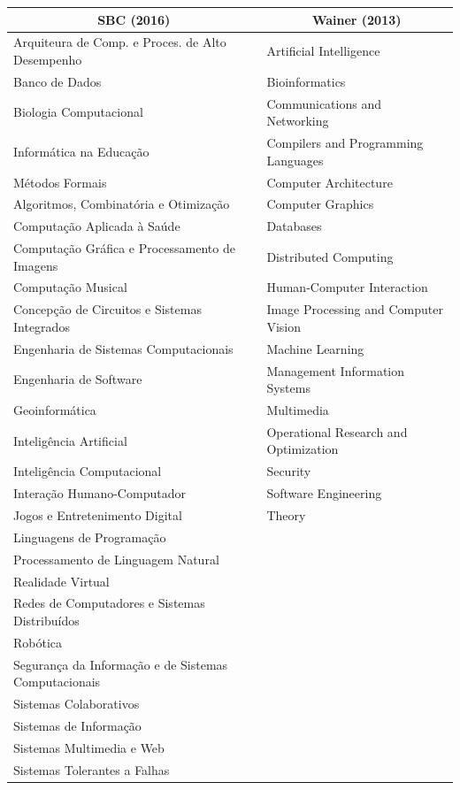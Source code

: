 \documentclass[msc]{ppgccufmg}
\begin{document}
\begin{appendices}
\begin{table}[t]
\centering
\scriptsize
\begin{tabular}{ll}
\toprule
\multicolumn{1}{c}{SBC (2016)}						&	\multicolumn{1}{c}{Wainer (2013)}		\\								
\midrule
Arquiteura de Comp. e Proces. de Alto Desempenho	&	Artificial Intelligence					\\
Banco de Dados										&	Bioinformatics							\\
Biologia Computacional 								&	Communications and Networking			\\
Informática na Educação		&	Compilers and Programming Languages		\\
Métodos Formais				&	Computer Architecture					\\
Algoritmos, Combinatória e Otimização	&	Computer Graphics						\\
Computação Aplicada à Saúde							&	Databases								\\
Computação Gráfica e Processamento de Imagens		&	Distributed Computing					\\
Computação Musical 									&	Human-Computer Interaction				\\
Concepção de Circuitos e Sistemas Integrados 		&	Image Processing and Computer Vision	\\
Engenharia de Sistemas Computacionais				&	Machine Learning						\\
Engenharia de Software								&	Management Information Systems			\\
Geoinformática										&	Multimedia								\\
Inteligência Artificial								&	Operational Research and Optimization	\\
Inteligência Computacional 							&	Security								\\
Interação Humano-Computador							&	Software Engineering					\\
Jogos e Entretenimento Digital 						&	Theory									\\
Linguagens de Programação							&											\\
Processamento de Linguagem Natural					&											\\
Realidade Virtual									&											\\
Redes de Computadores e Sistemas Distribuídos		&											\\
Robótica 											&											\\
Segurança da Informação e de Sistemas Computacionais&	 										\\
Sistemas Colaborativos								&											\\
Sistemas de Informação								&											\\
Sistemas Multimedia e Web							&											\\
Sistemas Tolerantes a Falhas 						&											\\
\bottomrule
\end{tabular}
\end{table}


\end{appendices}
\end{document}
